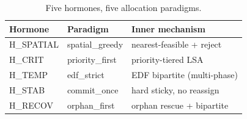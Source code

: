 \begin{table}[t]
\centering
\caption{Five hormones, five allocation paradigms.}
\label{tab:hormones}
\small
\begin{tabular}{lll}
\toprule
\textbf{Hormone} & \textbf{Paradigm} & \textbf{Inner mechanism} \\
\midrule
H\_SPATIAL & spatial\_greedy   & nearest-feasible + reject \\
H\_CRIT    & priority\_first   & priority-tiered LSA \\
H\_TEMP    & edf\_strict       & EDF bipartite (multi-phase) \\
H\_STAB    & commit\_once      & hard sticky, no reassign \\
H\_RECOV   & orphan\_first     & orphan rescue + bipartite \\
\bottomrule
\end{tabular}
\end{table}
